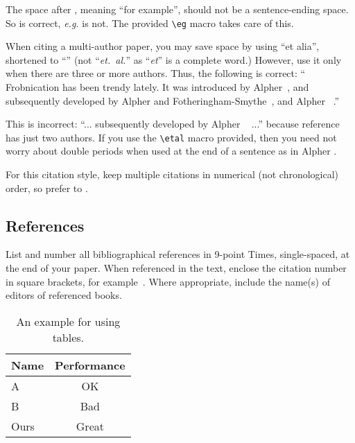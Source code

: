 \documentclass[10pt,twocolumn,letterpaper]{article}
\begin{document}
The space after \eg, meaning ``for example'', should not be a
sentence-ending space. So \eg is correct, {\em e.g.} is not.  The provided
\verb'\eg' macro takes care of this.

When citing a multi-author paper, you may save space by using ``et alia'',
shortened to ``\etal'' (not ``{\em et.\ al.}'' as ``{\em et}'' is a complete word.)
However, use it only when there are three or more authors.  Thus, the
following is correct: ``
   Frobnication has been trendy lately.
   It was introduced by Alpher~\cite{Alpher02}, and subsequently developed by
   Alpher and Fotheringham-Smythe~\cite{Alpher03}, and Alpher \etal~\cite{Alpher04}.''

This is incorrect: ``... subsequently developed by Alpher \etal~\cite{Alpher03} ...''
because reference~\cite{Alpher03} has just two authors.  If you use the
\verb'\etal' macro provided, then you need not worry about double periods
when used at the end of a sentence as in Alpher \etal.

For this citation style, keep multiple citations in numerical (not
chronological) order, so prefer \cite{Alpher03,Alpher02,Authors12} to
\cite{Alpher02,Alpher03,Authors12}.

\subsection{References}

List and number all bibliographical references in 9-point Times,
single-spaced, at the end of your paper. When referenced in the text,
enclose the citation number in square brackets, for
example~\cite{Authors12}.  Where appropriate, include the name(s) of
editors of referenced books.

\begin{table}
\begin{center}
\begin{tabular}{|l|c|}
\hline
Name & Performance \\
\hline\hline
A & OK\\
B & Bad \\
Ours & Great\\
\hline
\end{tabular}
\end{center}
\caption{An example for using tables.}
\end{table}

\end{document}
